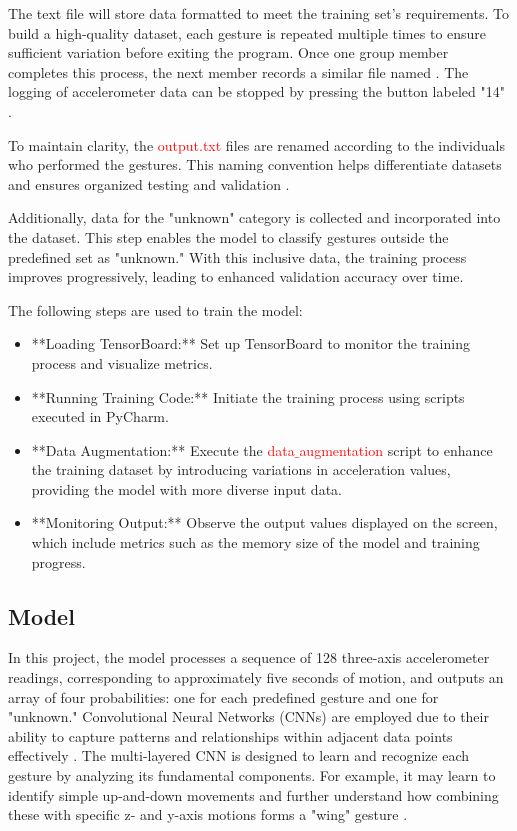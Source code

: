 The text file will store data formatted to meet the training set's requirements. To build a high-quality dataset, each gesture is repeated multiple times to ensure sufficient variation before exiting the program. Once one group member completes this process, the next member records a similar file named . The logging of accelerometer data can be stopped by pressing the button labeled "14" \cite{Wings:2023}.  

To maintain clarity, the \textcolor{red}{output.txt} files are renamed according to the individuals who performed the gestures. This naming convention helps differentiate datasets and ensures organized testing and validation \cite{Warden:2020}.  

Additionally, data for the "unknown" category is collected and incorporated into the dataset. This step enables the model to classify gestures outside the predefined set as "unknown." With this inclusive data, the training process improves progressively, leading to enhanced validation accuracy over time.  

The following steps are used to train the model:  

\begin{itemize}  
	\item **Loading TensorBoard:** Set up TensorBoard to monitor the training process and visualize metrics.  
	\item **Running Training Code:** Initiate the training process using scripts executed in PyCharm.  
	\item **Data Augmentation:** Execute the \textcolor{red}{data$\_$augmentation} script to enhance the training dataset by introducing variations in acceleration values, providing the model with more diverse input data.  
	\item **Monitoring Output:** Observe the output values displayed on the screen, which include metrics such as the memory size of the model and training progress.  
\end{itemize}  

\subsection{Model}

In this project, the model processes a sequence of 128 three-axis accelerometer readings, corresponding to approximately five seconds of motion, and outputs an array of four probabilities: one for each predefined gesture and one for "unknown." Convolutional Neural Networks (CNNs) are employed due to their ability to capture patterns and relationships within adjacent data points effectively \cite{Warden:2020}. The multi-layered CNN is designed to learn and recognize each gesture by analyzing its fundamental components. For example, it may learn to identify simple up-and-down movements and further understand how combining these with specific z- and y-axis motions forms a "wing" gesture \cite{Warden:2020}.  

